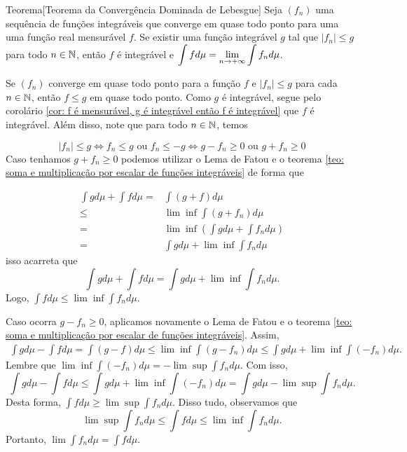 \begin{env}{Teorema}[Teorema da Convergência Dominada de Lebesgue]
	Seja $(f_n)$ uma sequência de funções integráveis que converge em quase todo ponto para uma uma função real mensurável $f$.
	Se existir uma função integrável $g$ tal que $|f_n| \leq g$ para todo $n \in \operatorname{\mathbb{N}}$, então $f$ é integrável e $\displaystyle \int f d\mu = \displaystyle \lim_{n \to +\infty} \int f_n d\mu$.
\end{env}

\begin{prova}
	Se $(f_n)$ converge em quase todo ponto para a função $f$ e $|f_n| \leq g$ para cada $n \in \operatorname{\mathbb{N}}$, então $f \leq g$ em quase todo ponto.
	Como $g$ é integrável, segue pelo corolário \ref{cor: f é mensurável, g é integrável então f é integrável} que $f$ é integrável.
	Além disso, note que para todo $n \in \operatorname{\mathbb{N}}$, temos
	
	$$
	|f_n| \leq g 
	\Leftrightarrow 
	f_n \leq g 
	\textrm{\ ou \ }
	 f_n \leq -g
	\Leftrightarrow
	g - f_n \geq 0
	\textrm{\ ou \ }
	g + f_n \geq 0
	$$
	Caso tenhamos $g + f_n \geq 0$ podemos utilizar o Lema de Fatou e o teorema \ref{teo: soma e multiplicação por escalar de funções integráveis} de forma que 
	
	\begin{align*}
		\int g d\mu + \int f d\mu =& \int (g + f) d\mu \\
		\leq & \lim \inf \int (g + f_n) d\mu \\
		=& \lim \inf \left(\int g d\mu + \int f_n d\mu\right)\\
		=& \int g d\mu + \lim \inf \int f_n d\mu
	\end{align*}
	isso acarreta que 
	$$
	\int g d\mu + \int f d\mu = \int g d\mu + \lim \inf \int f_n d\mu.
	$$
	Logo, $\displaystyle \int f d\mu \leq \lim \inf \int f_n d\mu$.
	
	Caso ocorra $g - f_n \geq 0$, aplicamos novamente o Lema de Fatou e o teorema \ref{teo: soma e multiplicação por escalar de funções integráveis}.
	Assim, 
	\begin{align*}
		\int g d\mu - \int f d\mu = \int (g - f) d\mu
		\leq  \lim \inf \int (g - f_n) d\mu
		\leq \int g d\mu + \lim \inf \int (- f_n) d\mu.
	\end{align*}
	Lembre que $\displaystyle \lim \inf \int (- f_n) d\mu = - \lim \sup \int f_n d\mu$.
	Com isso, 
	$$
	\int g d\mu - \int f d\mu \leq 
	\int g d\mu + \lim \inf \int (- f_n) d\mu
	=
	\int g d\mu - \lim \sup \int f_n d\mu.
	$$
	Desta forma, $\displaystyle \int f d\mu \geq \lim \sup \int f_n d\mu$.
	Disso tudo, observamos que 
	$$
	\lim \sup \int f_n d\mu \leq  \int f d\mu \leq \lim \inf \int f_n d\mu. 
	$$
	Portanto, $\displaystyle \lim \int f_n d\mu =  \int f d\mu $.
\end{prova}























